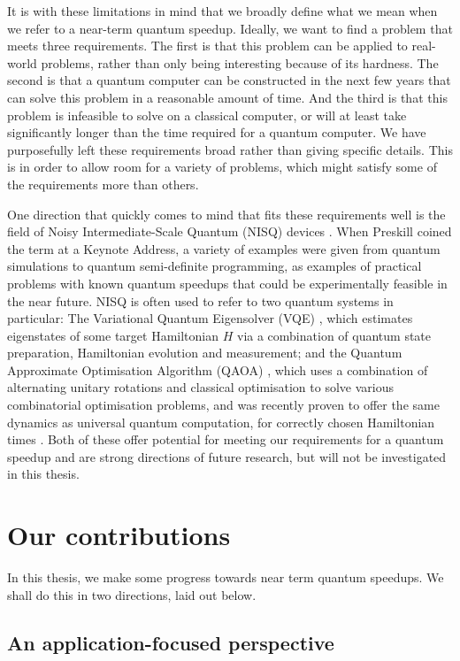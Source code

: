 It is with these limitations in mind that we broadly define what we mean when we refer to a near-term quantum speedup. Ideally, we want to find a problem that meets three requirements. The first is that this problem can be applied to real-world problems, rather than only being interesting because of its hardness. The second is that a quantum computer can be constructed in the next few years that can solve this problem in a reasonable amount of time. And the third is that this problem is infeasible to solve on a classical computer, or will at least take significantly longer than the time required for a quantum computer. We have purposefully left these requirements broad rather than giving specific details. This is in order to allow room for a variety of problems, which might satisfy some of the requirements more than others.

One direction that quickly comes to mind that fits these requirements well is the field of Noisy Intermediate-Scale Quantum (NISQ) devices \cite{preskill2018}. When Preskill coined the term at a Keynote Address, a variety of examples were given from quantum simulations to quantum semi-definite programming, as examples of practical problems with known quantum speedups that could be experimentally feasible in the near future. NISQ is often used to refer to two quantum systems in particular: The Variational Quantum Eigensolver (VQE) \cite{peruzzo2014}, which estimates eigenstates of some target Hamiltonian $H$ via a combination of quantum state preparation, Hamiltonian evolution and measurement; and the Quantum Approximate Optimisation Algorithm (QAOA) \cite{farhi2014}, which uses a combination of alternating unitary rotations and classical optimisation to solve various combinatorial optimisation problems, and was recently proven to offer the same dynamics as universal quantum computation, for correctly chosen Hamiltonian times \cite{lloyd2018, morales2019}. Both of these offer potential for meeting our requirements for a quantum speedup and are strong directions of future research, but will not be investigated in this thesis.

\section{Our contributions}
\label{sec:contributions}

In this thesis, we make some progress towards near term quantum speedups. We shall do this in two directions, laid out below.

\subsection{An application-focused perspective}

